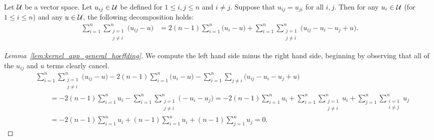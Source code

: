 \begin{lemma}
  \label{lem:kernel_app_general_hoeffding}

  Let $\mathcal{U}$ be a vector space.
  Let $u_{i j} \in \mathcal{U}$ be defined for
  $1 \leq i, j \leq n$
  and
  $i \neq j$.
  Suppose that $u_{i j} = u_{j i}$
  for all $i,j$.
  Then for any $u_i \in \mathcal{U}$
  (for $1 \leq i \leq n$)
  and any $u \in \mathcal{U}$,
  the following decomposition holds:
  \begin{align*}
    \sum_{i=1}^n
    \sum_{\substack{j=1 \\ j \neq i}}^n
    \big(u_{i j} - u\big)
    &=
    2(n-1)
    \sum_{i=1}^n
    \big(u_i - u\big)
    +
    \sum_{i=1}^n
    \sum_{\substack{j=1 \\ j \neq i}}^n
    \big(u_{i j} - u_i - u_j + u\big).
  \end{align*}

\end{lemma}

\begin{proof}[Lemma~\ref{lem:kernel_app_general_hoeffding}]

  We compute the left hand side minus the right hand side,
  beginning by observing that all of the
  $u_{i j}$ and $u$ terms clearly cancel.
  \begin{align*}
    &\sum_{i=1}^n
    \sum_{\substack{j=1 \\ j \neq i}}^n
    \big(u_{i j} - u\big)
    - 2(n-1)
    \sum_{i=1}^n
    \big(u_i - u\big)
    -
    \sum_{i=1}^n
    \sum_{j \neq i}
    \big(u_{i j} - u_i - u_j + u\big) \\
    &\qquad=
    - 2(n-1)
    \sum_{i=1}^n
    u_i
    -
    \sum_{i=1}^n
    \sum_{\substack{j=1 \\ j \neq i}}^n
    \big(- u_i - u_j\big)
    =
    - 2(n-1)
    \sum_{i=1}^n
    u_i
    +
    \sum_{i=1}^n
    \sum_{\substack{j=1 \\ j \neq i}}^n
    u_i
    +
    \sum_{j=1}^n
    \sum_{\substack{i=1 \\ i \neq j}}^n
    u_j \\
    &\qquad=
    - 2(n-1)
    \sum_{i=1}^n
    u_i
    +
    (n-1)
    \sum_{i=1}^n
    u_i
    +
    (n-1)
    \sum_{j=1}^n
    u_j
    = 0.
  \end{align*}
\end{proof}

